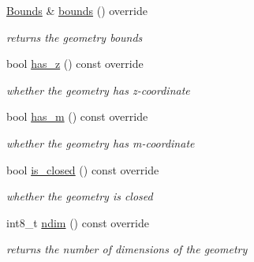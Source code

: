 \begin{DoxyCompactItemize}
\hyperlink{classsimo_1_1shapes_1_1_bounds}{Bounds} \& \hyperlink{classsimo_1_1shapes_1_1_basic_geometry_aef057b58858f64a47a8fa68b7a9ef7d1}{bounds} () override
\begin{DoxyCompactList}\small\item\em returns the geometry bounds \end{DoxyCompactList}\item 
bool \hyperlink{classsimo_1_1shapes_1_1_basic_geometry_adf922693df08f41d170438836bc90c6b}{has\-\_\-z} () const override
\begin{DoxyCompactList}\small\item\em whether the geometry has z-\/coordinate \end{DoxyCompactList}\item 
bool \hyperlink{classsimo_1_1shapes_1_1_basic_geometry_ae67e31810708aa668749f1d1ae8ae28b}{has\-\_\-m} () const override
\begin{DoxyCompactList}\small\item\em whether the geometry has m-\/coordinate \end{DoxyCompactList}\item 
bool \hyperlink{classsimo_1_1shapes_1_1_basic_geometry_ae5ad57479626834ef3c4e10c2fb2275b}{is\-\_\-closed} () const override
\begin{DoxyCompactList}\small\item\em whether the geometry is closed \end{DoxyCompactList}\item 
int8\-\_\-t \hyperlink{classsimo_1_1shapes_1_1_basic_geometry_ae5ae8173a8c166d98ddda0fbfbc48346}{ndim} () const override
\begin{DoxyCompactList}\small\item\em returns the number of dimensions of the geometry \end{DoxyCompactList}\end{DoxyCompactItemize}

